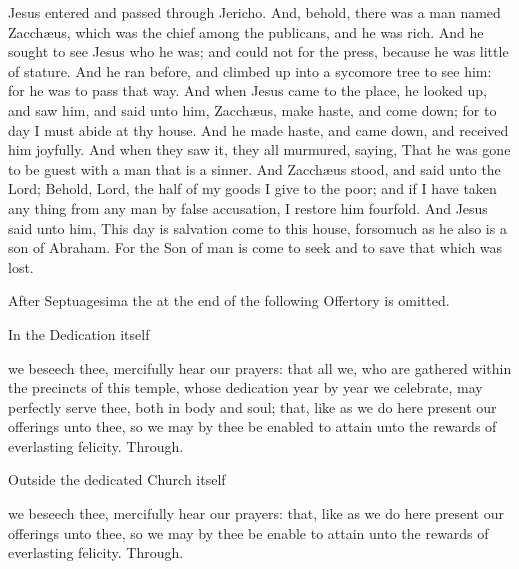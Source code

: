  Jesus entered and passed through Jericho. And, behold, there was a man named Zacch{\ae}us, which was the chief among the publicans, and he was rich. And he sought to see Jesus who he was; and could not for the press, because he was little of stature. And he ran before, and climbed up into a sycomore tree to see him: for he was to pass that way. And when Jesus came to the place, he looked up, and saw him, and said unto him, Zacch{\ae}us, make haste, and come down; for to day I must abide at thy house. And he made haste, and came down, and received him joyfully. And when they saw it, they all murmured, saying, That he was gone to be guest with a man that is a sinner. And Zacch{\ae}us stood, and said unto the Lord; Behold, Lord, the half of my goods I give to the poor; and if I have taken any thing from any man by false accusation, I restore him fourfold. And Jesus said unto him, This day is salvation come to this house, forsomuch as he also is a son of Abraham. For the Son of man is come to seek and to save that which was lost.

\begin{rubric}
	After Septuagesima the  at the end of the following Offertory is omitted.
\end{rubric}

\secret

\begin{inhead}
	In the Dedication itself
\end{inhead}
 we beseech thee, mercifully hear our prayers: that all we, who are gathered within the precincts of this temple, whose dedication year by year we celebrate, may perfectly serve thee, both in body and soul; that, like as we do here present our offerings unto thee, so we may by thee be enabled to attain unto the rewards of everlasting felicity. Through.

\begin{inhead}
	Outside the dedicated Church itself
\end{inhead}
 we beseech thee, mercifully hear our prayers: that, like as we do here present our offerings unto thee, so we may by thee be enable to attain unto the rewards of everlasting felicity. Through.

